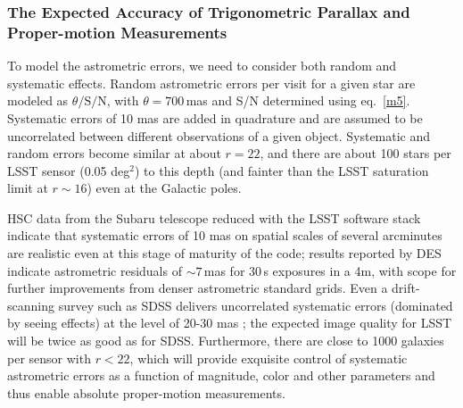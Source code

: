 \subsubsection{The Expected Accuracy of Trigonometric Parallax and Proper-motion Measurements}
\label{sec:astrom}

To model the astrometric errors, we need to consider both random and
systematic effects.
Random astrometric errors per
visit for a given star are modeled as $\theta/\mathrm{S/N}$, with $\theta=700$\,mas and S/N determined using
eq.~\ref{m5}.
Systematic
errors of 10 mas are added in quadrature and are assumed to be uncorrelated
between different observations of a given object. Systematic and random
errors become similar at about $r=22$, and there are about 100 stars per LSST
sensor (0.05 deg$^2$) to this depth (and fainter than the LSST saturation limit at
$r\sim16$) even at the Galactic poles.

HSC data from the Subaru telescope reduced with the LSST software stack indicate that systematic errors of
10 mas on spatial scales of several arcminutes are realistic even at this stage of maturity of the
code; results reported by DES \citep{2017PASP..129g4503B} indicate astrometric residuals of $\sim 7\,$mas for 30\,s exposures
in a 4m, with scope for further improvements from denser astrometric standard grids. Even a drift-scanning
survey such as SDSS delivers uncorrelated systematic errors (dominated by seeing
effects) at the level of 20-30 mas \citep[measured from repeated scans;][]{2003AJ....125.1559P};
the expected image quality for LSST will be twice as good as for SDSS. Furthermore,
there are close to 1000 galaxies per sensor with $r<22$, which will provide exquisite
control of systematic astrometric errors as a function of magnitude, color and other
parameters and thus enable absolute proper-motion measurements.



